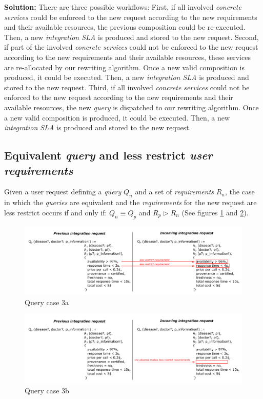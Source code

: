 \bigskip
\noindent \textbf{Solution:} There are three possible workflows: First, if all involved \textsl{concrete services} could be enforced to the new request according to the new requirements and their available resources, the previous composition could be re-executed. Then, a new \textsl{integration SLA} is produced and stored to the new request. Second, if part of the involved \textsl{concrete services} could not be enforced to the new request according to the new requirements and their available resources, these services are re-allocated by our rewriting algorithm. Once a new valid composition is produced, it  could be executed. Then, a new \textsl{integration SLA} is produced and stored to the new request. Third, if all involved \textsl{concrete services} could not be enforced to the new request according to the new requirements and their available resources, the new \textsl{query} is dispatched to our rewriting algorithm. Once a new valid composition is produced, it  could be executed. Then, a new \textsl{integration SLA} is produced and stored to the new request.

\subsection{Equivalent \textsl{query} and less restrict \textsl{user requirements}}
Given a user request defining a \textsl{query} $Q_{n}$ and a set of \textsl{requirements} $R_{n}$, the case in which the \textsl{queries} are equivalent and the \textsl{requirements} for the new request are less restrict occurs if and only if: $Q_{n} \equiv Q_{p}$ and $R_{p} \triangleright R_{n}$ (See figures \ref{fig:case3a} and \ref{fig:case3b}).

\begin{figure}[h!]
\center
\includegraphics[scale=0.85]{figures/query-case-3a.pdf}\caption{Query case 3a} \label{fig:case3a}
\end{figure}

\begin{figure}[h!]
\center
\includegraphics[scale=0.85]{figures/query-case-3b.pdf}\caption{Query case 3b} \label{fig:case3b}
\end{figure}

